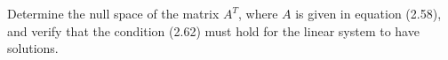 

Determine the null space of the matrix $A^T$, where $A$ is given in
equation (2.58), and verify that the condition (2.62) must hold for the
linear system to have solutions.

